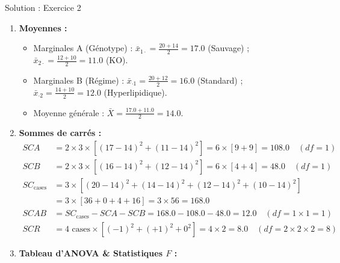 \documentclass[11pt,a4paper]{article}
\begin{document}
\begin{solutionbox}{Solution : Exercice 2}
\begin{enumerate}[label=\textbf{\alph*.}]
  \item \textbf{Moyennes :}
  \begin{itemize}
    \item Marginales A (Génotype) : $\bar{x}_{1\cdot} = \frac{20+14}{2} = 17.0$ (Sauvage) ; $\bar{x}_{2\cdot} = \frac{12+10}{2} = 11.0$ (KO).
    \item Marginales B (Régime) : $\bar{x}_{\cdot 1} = \frac{20+12}{2} = 16.0$ (Standard) ; $\bar{x}_{\cdot 2} = \frac{14+10}{2} = 12.0$ (Hyperlipidique).
    \item Moyenne générale : $\bar{X} = \frac{17.0 + 11.0}{2} = \mathbf{14.0}$.
  \end{itemize}
  \item \textbf{Sommes de carrés :}
  \begin{align*}
    SCA &= 2 \times 3 \times \left[ (17-14)^2 + (11-14)^2 \right] = 6 \times [9 + 9] = \mathbf{108.0} \quad (df = 1) \\
    SCB &= 2 \times 3 \times \left[ (16-14)^2 + (12-14)^2 \right] = 6 \times [4 + 4] = \mathbf{48.0} \quad (df = 1) \\
    SC_{\text{cases}} &= 3 \times \left[ (20-14)^2 + (14-14)^2 + (12-14)^2 + (10-14)^2 \right] \\
    &= 3 \times [36 + 0 + 4 + 16] = 3 \times 56 = 168.0 \\
    SCAB &= SC_{\text{cases}} - SCA - SCB = 168.0 - 108.0 - 48.0 = \mathbf{12.0} \quad (df = 1 \times 1 = 1) \\
    SCR &= 4 \text{ cases} \times [(-1)^2 + (+1)^2 + 0^2] = 4 \times 2 = \mathbf{8.0} \quad (df = 2 \times 2 \times 2 = 8)
  \end{align*}
  \item \textbf{Tableau d'ANOVA \& Statistiques $F$ :}
  \begin{center}
\end{center}
\end{enumerate}
\end{solutionbox}
\end{document}
